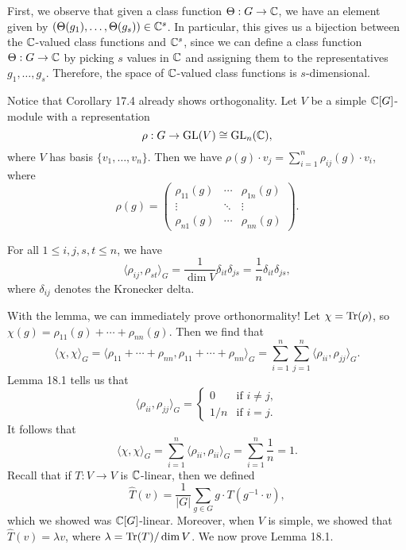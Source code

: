 First, we observe that given a class function $\Theta : G \to \mathbb{C}$, we have 
an element given by $(\Theta(g_1), \dots, \Theta(g_s)) \in \mathbb{C}^s$. In 
particular, this gives us a bijection between the $\mathbb{C}$-valued class functions 
and $\mathbb{C}^s$, since we can define a class function $\Theta : G \to \mathbb{C}$ 
by picking $s$ values in $\mathbb{C}$ and assigning them to the representatives
$g_1, \dots, g_s$. Therefore, the space of $\mathbb{C}$-valued class functions 
is $s$-dimensional. 

Notice that Corollary 17.4 already shows orthogonality. Let $V$ 
be a simple $\mathbb{C}[G]$-module with a representation
\[ \rho : G \to \operatorname{GL}(V) \cong \operatorname{GL}_n(\mathbb{C}), \] 
where $V$ has basis $\{v_1, \dots, v_n\}$. Then we have $\rho(g) \cdot v_j 
= \sum_{i=1}^n \rho_{ij}(g) \cdot v_i$, where 
\[ \rho(g) = \begin{pmatrix}
    \rho_{11}(g) & \cdots & \rho_{1n}(g) \\ 
    \vdots & \ddots & \vdots \\ 
    \rho_{n1}(g) & \cdots & \rho_{nn}(g) 
\end{pmatrix}. \] 

\begin{lemma}{}
    For all $1 \leq i, j, s, t \leq n$, we have 
    \[ \langle \rho_{ij}, \rho_{st} \rangle_G = \frac1{\dim V} \delta_{it} 
    \delta_{js} = \frac1n \delta_{it} \delta_{js}, \] 
    where $\delta_{ij}$ denotes the Kronecker delta. 
\end{lemma}

With the lemma, we can immediately prove orthonormality! Let $\chi = 
\operatorname{Tr}(\rho)$, so $\chi(g) = \rho_{11}(g) + \cdots + \rho_{nn}(g)$. Then we find that 
\[ \langle \chi, \chi \rangle_G = \langle \rho_{11} + \cdots + \rho_{nn}, 
\rho_{11} + \cdots + \rho_{nn} \rangle_G = \sum_{i=1}^n \sum_{j=1}^n 
\langle \rho_{ii}, \rho_{jj} \rangle_G. \] 
Lemma 18.1 tells us that 
\[ \langle \rho_{ii}, \rho_{jj} \rangle_G = \begin{cases} 
    0 & \text{if } i \neq j, \\ 
    1/n & \text{if } i = j. 
\end{cases} \] 
It follows that 
\[ \langle \chi, \chi \rangle_G = \sum_{i=1}^n \langle \rho_{ii}, \rho_{ii} 
\rangle_G = \sum_{i=1}^n \frac1n = 1. \] 
Recall that if $T : V \to V$ is $\mathbb{C}$-linear, then we defined 
\[ \hat T(v) = \frac1{|G|} \sum_{g \in G} g \cdot T(g^{-1} \cdot v), \] 
which we showed was $\mathbb{C}[G]$-linear. Moreover, when $V$ is simple, we showed 
that $\hat T(v) = \lambda v$, where $\lambda = \operatorname{Tr}(T)/\dim V$. We 
now prove Lemma 18.1. 

